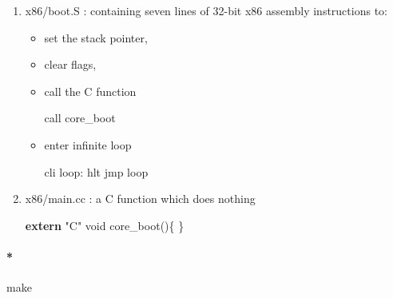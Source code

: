 \documentclass[]{article}
\newenvironment{Shaded}{}{}
\newcommand{\KeywordTok}[1]{\textbf{{#1}}}
\newcommand{\DataTypeTok}[1]{\textcolor[rgb]{0.50,0.00,0.00}{{#1}}}
\newcommand{\DecValTok}[1]{\textcolor[rgb]{0.00,0.00,1.00}{{#1}}}
\newcommand{\BaseNTok}[1]{\textcolor[rgb]{0.00,0.00,1.00}{{#1}}}
\newcommand{\StringTok}[1]{\textcolor[rgb]{0.87,0.00,0.00}{{#1}}}
\newcommand{\FunctionTok}[1]{\textcolor[rgb]{0.00,0.00,0.50}{{#1}}}
\newcommand{\BuiltInTok}[1]{{#1}}
\newcommand{\NormalTok}[1]{{#1}}
\let\oldparagraph\paragraph
\renewcommand{\paragraph}[1]{\oldparagraph{#1}\mbox{}}
\begin{document}
\begin{enumerate}
\def\labelenumi{\arabic{enumi}.}
\item
  x86/boot.S : containing seven lines of 32-bit x86 assembly
  instructions to:

  \begin{itemize}
  \item
    set the stack pointer,

\begin{Shaded}
\end{Shaded}
  \item
    clear flags,

\begin{Shaded}
\end{Shaded}
  \item
    call the C function

\begin{Shaded}
\begin{Highlighting}[]
   \BuiltInTok{call}  \NormalTok{core_boot}
\end{Highlighting}
\end{Shaded}
  \item
    enter infinite loop

\begin{Shaded}
\begin{Highlighting}[]
   \BuiltInTok{cli}
\FunctionTok{ loop:}
   \BuiltInTok{hlt}
   \BuiltInTok{jmp}   \BuiltInTok{loop}
\end{Highlighting}
\end{Shaded}
  \end{itemize}
\item
  x86/main.cc : a C function which does nothing

\begin{Shaded}
\begin{Highlighting}[]
 \KeywordTok{extern} \StringTok{"C"} \DataTypeTok{void} \NormalTok{core_boot()\{}
 \NormalTok{\}}
\end{Highlighting}
\end{Shaded}
\end{enumerate}

\paragraph*{make}\label{make}
\end{document}
